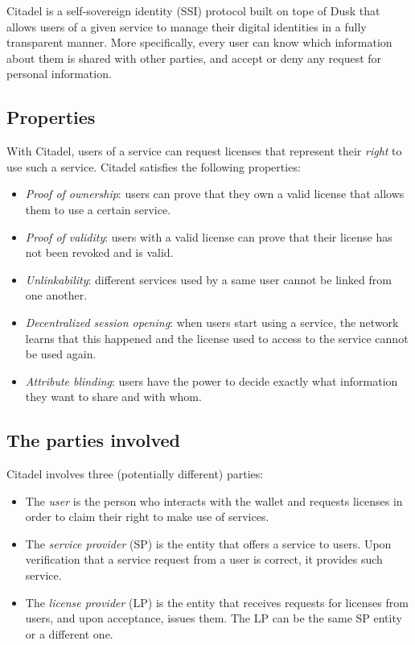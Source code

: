 
Citadel is a self-sovereign identity (SSI) protocol built on tope of Dusk that allows users of a given service to manage their digital identities in a fully transparent manner. More specifically, every user can know which information about them is shared with other parties, and accept or deny any request for personal information.

\subsection{Properties}

With Citadel, users of a service can request licenses that represent their \emph{right} to use such a service. Citadel satisfies the following properties:

\begin{itemize}
	\item \emph{Proof of ownership}: users can prove that they own a valid license that allows them to use a certain service.
	\item \emph{Proof of validity}: users with a valid license can prove that their license has not been revoked and is valid.
	\item \emph{Unlinkability}: different services used by a same user cannot be linked from one another.
	\item \emph{Decentralized session opening}: when users start using a service, the network learns that this happened and the license used to access to the service cannot be used again.
	\item \emph{Attribute blinding}: users have the power to decide exactly what information they want to share and with whom.
\end{itemize}

\subsection{The parties involved}

Citadel involves three (potentially different) parties:

\begin{itemize}
    \item The \emph{user} is the person who interacts with the wallet and requests licenses in order to claim their right to make use of services.
    \item The \emph{service provider} (SP) is the entity that offers a service to users. Upon verification that a service request from a user is correct, it provides such service.
    \item The \emph{license provider} (LP) is the entity that receives requests for licenses from users, and upon acceptance, issues them. The LP can be the same SP entity or a different one.
\end{itemize}

